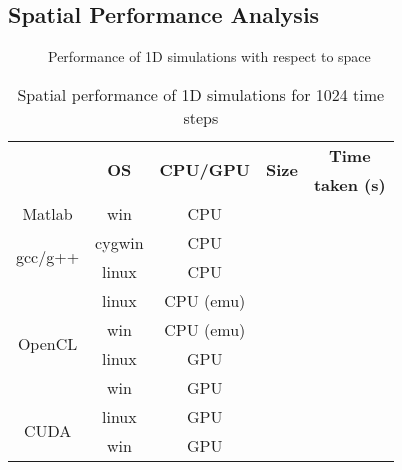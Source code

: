 \subsection{Spatial Performance Analysis}

\begin{figure}[H]
\centering
{}
\caption{Performance of 1D simulations with respect to space}
\label{fig:Performance-1D-space}
\end{figure}

\begin{table}[H]
\begin{center}
\vspace{0.3cm}
	\begin{tabular}{ccccc}
	\hline \hline
		\rule{0pt}{2.6ex} \multirow{2}{*}{\textbf{API}} & \multirow{2}{*}{\textbf{OS}} & \multirow{2}{*}{\textbf{CPU/GPU}} & \multirow{2}{*}{\textbf{Size}} & \textbf{Time}\\
		& &  & & \textbf{taken (s)}\\
		\hline
		Matlab \rule{0pt}{2.6ex} & win & CPU & &\\
		\hline
		\multirow{2}{*}{gcc/g++} \rule{0pt}{2.6ex} & cygwin & CPU & &\\
		& linux & CPU & &\\
		\hline
		\multirow{4}{*}{OpenCL} \rule{0pt}{2.6ex} & linux & CPU (emu) & &\\
		& win & CPU (emu) & &\\
		& linux & GPU & &\\
		& win & GPU & &\\
		\hline
		\multirow{2}{*}{CUDA} \rule{0pt}{2.6ex} & linux & GPU & &\\
		& win & GPU & &\\
	\hline \hline
	\end{tabular}
\end{center}
\caption{Spatial performance of 1D simulations for 1024 time steps}
\label{Tab:Performance-1D-space}
\end{table}

